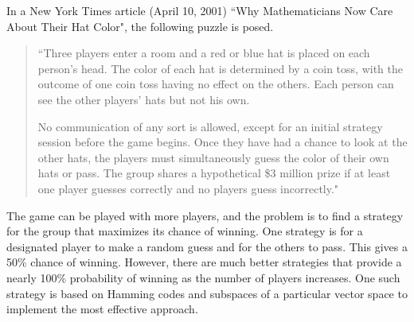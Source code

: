  \label{chap:vector_spaces}

\vspace*{-17 pt}

\vspace*{13 pt}

\label{sec:appl_hat_puzzle}

In a New York Times article (April 10, 2001) ``Why Mathematicians Now Care About Their Hat Color", the following puzzle is posed.
\begin{quote} ``Three players enter a room and a red or blue hat is placed on each person's head. The color of each hat is determined by a coin toss, with the outcome of one coin toss having no effect on the others. Each person can see the other players' hats but not his own.

No communication of any sort is allowed, except for an initial strategy session before the game begins. Once they have had a chance to look at the other hats, the players must simultaneously guess the color of their own hats or pass. The group shares a hypothetical \$3 million prize if at least one player guesses correctly and no players guess incorrectly."
\end{quote}

The game can be played with more players, and the problem is to find a strategy for the group that maximizes its chance of winning. One strategy is for a designated player to make a random guess and for the others to pass. This gives a 50\% chance of winning. However, there are much better strategies that provide a nearly 100\% probability of winning as the number of players increases. One such strategy is based on Hamming codes and subspaces of a particular vector space to implement the most effective approach. 


